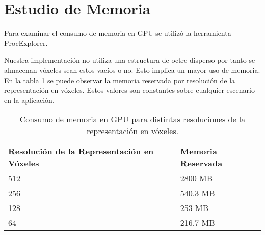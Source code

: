 \section{Estudio de Memoria}
Para examinar el consumo de memoria en GPU se utilizó la herramienta ProcExplorer.

Nuestra implementación no utiliza una estructura de octre disperso por tanto se almacenan vóxeles sean estos vacíos o no. Esto implica un mayor uso de memoria. En la tabla \ref{tab:memory} se puede observar la memoria reservada por resolución de la representación en vóxeles. Estos valores son constantes sobre cualquier escenario en la aplicación.

\begin{table}[h]
\centering
\begin{tabular}{ll}
Resolución de la Representación en Vóxeles & Memoria Reservada             \\ \hline
\multicolumn{1}{|l|}{512}                  & \multicolumn{1}{l|}{2800 MB}  \\
\multicolumn{1}{|l|}{256}                  & \multicolumn{1}{l|}{540.3 MB} \\
\multicolumn{1}{|l|}{128}                  & \multicolumn{1}{l|}{253 MB}   \\
\multicolumn{1}{|l|}{64}                   & \multicolumn{1}{l|}{216.7 MB} \\ \hline
\end{tabular}
\caption{Consumo de memoria en GPU para distintas resoluciones de la representación en vóxeles.}
\label{tab:memory}
\end{table}
